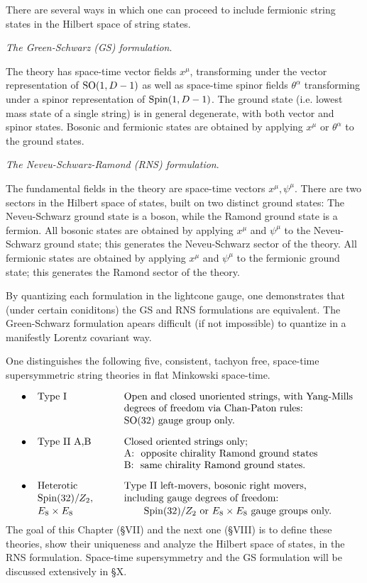 There are several ways in which one can proceed to include
fermionic string states in the Hilbert space of string
states.

\medskip
{} {\it The Green-Schwarz (GS) formulation}.

\Item{}The theory has space-time vector fields
$x^\mu$, transforming under the vector representation
of ${\rm SO}(1,D-1)$ as well as space-time spinor fields
$\theta^\alpha$ transforming under a spinor representation
of ${\rm Spin}(1,D-1)$.
The ground state (i.e. lowest mass state of a single
string) is in general degenerate, with both vector and
spinor states.
Bosonic and fermionic states are obtained by applying
$x^\mu$ or $\theta^\alpha$ to the ground states.

\medskip
{} {\it The Neveu-Schwarz-Ramond (RNS) formulation}.

\Item{}The fundamental fields in the theory are
space-time vectors $x^\mu,\psi^\mu$.
There
are two sectors in the Hilbert space of states, built
on two distinct ground states:
The Neveu-Schwarz ground state is a boson, while the
Ramond ground state is a fermion.
All bosonic states are obtained by applying $x^\mu$ 
and $\psi^\mu$ to the Neveu-Schwarz ground state; this
generates the Neveu-Schwarz sector of the theory.
All fermionic states are obtained by applying $x^\mu$
and $\psi^\mu$ to the fermionic ground state; this
generates the Ramond sector of the theory.

\medskip\noindent
By quantizing each formulation in the lightcone
gauge, one demonstrates that (under certain
coniditons) the GS and RNS formulations are equivalent.
The Green-Schwarz formulation apears difficult (if not
impossible) to quantize in a manifestly Lorentz
 covariant way.

One distinguishes the following five, consistent,
tachyon free, space-time supersymmetric string
theories in flat Minkowski space-time.

\vfill\eject

$$
\vbox{\tabskip=8pt
\offinterlineskip
\halign to \hsize{#\hfill &#\hfill &\qquad #\hfill\cr
$\bullet$ &Type I &Open and closed unoriented
strings, with Yang-Mills\cr
\noalign{\smallskip}
&&degrees of freedom via Chan-Paton rules:\cr
\noalign{\smallskip}
&&$\SO(32)$ gauge group only.\cr
\noalign{\bigskip}
$\bullet$ &Type II$\,\,$A,B &Closed oriented strings
only;\cr
\noalign{\smallskip}
&&A: \ opposite chirality Ramond ground states\cr
\noalign{\smallskip}
&&B: \ same chirality Ramond ground states.\cr
\noalign{\bigskip}
$\bullet$ &Heterotic &Type II left-movers, 
     bosonic right movers,\cr
\noalign{\smallskip}
&$\Spin(32)/Z_2,$ &including gauge degrees of freedom:\cr
\noalign{\smallskip}
&$E_8\times E_8$ &\qquad $\Spin(32)/Z_2$ or 
$E_8\times E_8$ gauge groups only.\cr}}
$$
The goal of this Chapter (\S{VII}) and the next one
(\S{VIII}) is to define these theories, show their
uniqueness and analyze the Hilbert space of states, in
the RNS formulation.
Space-time supersymmetry and the GS formulation will
be discussed extensively in \S{X}.

